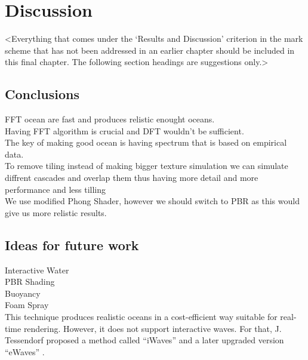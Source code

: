 \chapter{Discussion}
\label{chapter4}

<Everything that comes under the `Results and Discussion' criterion in the mark scheme that has not been addressed in an earlier chapter should be included in this final chapter. The following section headings are suggestions only.>

\section{Conclusions}

FFT ocean are fast and produces relistic enought oceans.\\
Having FFT algorithm is crucial and DFT wouldn't be sufficient.\\
The key of making good ocean is having spectrum that is based on empirical data.\\
To remove tiling instead of making bigger texture simulation we can simulate diffrent cascades and overlap them thus having more detail and more performance and less tilling\\
We use modified Phong Shader, however we should switch to PBR as this would give us more relistic results.


\section{Ideas for future work}
Interactive Water\\
PBR Shading\\
Buoyancy\\
Foam Spray\\
This technique produces realistic oceans in a cost-efficient way suitable for real-time rendering. However, it does not support interactive waves. For that, J. Tessendorf proposed a method called “iWaves” \cite{tessendorf2004} and a later upgraded version “eWaves” \cite{tessendorf2014}.


